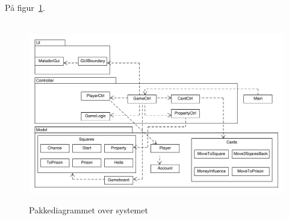 \documentclass[class=article, crop=false]{standalone}
\begin{document}
    På figur~\ref{fig:pakkediagram}.

    \begin{figure}[H]

        \hbox{\hspace{-2cm} \includegraphics[scale=0.7]{diagrams/pakke_diagram.pdf}}

        \caption{Pakkediagrammet over systemet}\label{fig:pakkediagram}
    \end{figure}
\end{document}

